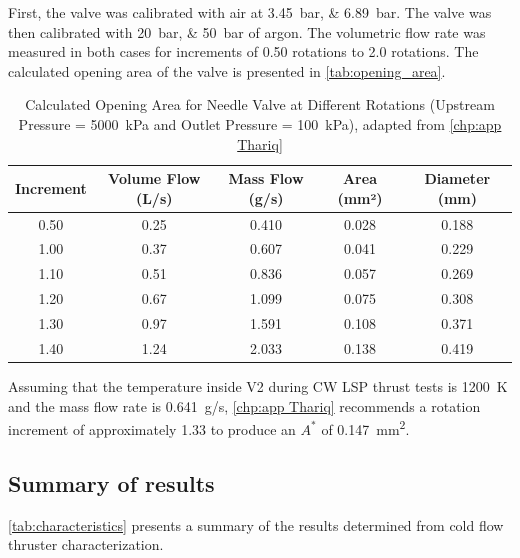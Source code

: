             First, the valve was calibrated with air at \qtylist{3.45;6.89}{bar}. The valve was then calibrated with \qtylist{20;50}{bar} of argon. The volumetric flow rate was measured in both cases for increments of 0.50 rotations to 2.0 rotations. The calculated opening area of the valve is presented in \autoref{tab:opening_area}.

            \begin{table}[!ht]
                \centering
                \caption{Calculated Opening Area for Needle Valve at Different Rotations (Upstream Pressure = \qty{5000}{kPa} and Outlet Pressure = \qty{100}{kPa}), adapted from \autoref{chp:app Thariq}}
                \label{tab:opening_area}
                \begin{tabular}{|c|c|c|c|c|}
                \hline
                \textbf{Increment} & \textbf{Volume Flow (L/s)} & \textbf{Mass Flow (g/s)} & \textbf{Area (mm²)} & \textbf{Diameter (mm)} \\ \hline
                0.50 & 0.25 & 0.410 & 0.028 & 0.188 \\ \hline
                1.00 & 0.37 & 0.607 & 0.041 & 0.229 \\ \hline
                1.10 & 0.51 & 0.836 & 0.057 & 0.269 \\ \hline
                1.20 & 0.67 & 1.099 & 0.075 & 0.308 \\ \hline
                1.30 & 0.97 & 1.591 & 0.108 & 0.371 \\ \hline
                1.40 & 1.24 & 2.033 & 0.138 & 0.419 \\ \hline
                \end{tabular}
            \end{table}

            Assuming that the temperature inside V2 during CW LSP thrust tests is \qty{1200}{K} and the mass flow rate is \qty{0.641}{g/s}, \autoref{chp:app Thariq} recommends a rotation increment of approximately 1.33 to produce an $A^*$ of \qty{0.147}{mm^2}.

        \subsection{Summary of results}

            \autoref{tab:characteristics} presents a summary of the results determined from cold flow thruster characterization.

